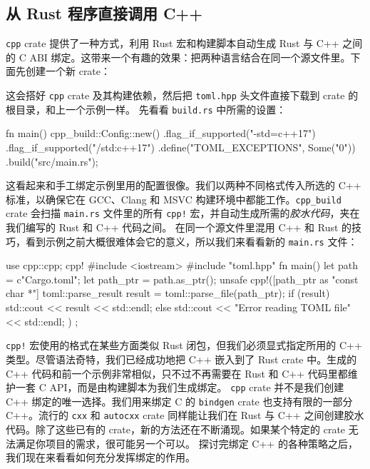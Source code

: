 \subsection{从 Rust 程序直接调用 C++}
\label{idx:idx_02f49e5b}
\texttt{cpp} crate 提供了一种方式，利用 Rust 宏和构建脚本自动生成 Rust 与 C++ 之间的 C ABI 绑定。这带来一个有趣的效果：把两种语言结合在同一个源文件里。下面先创建一个新 crate：
这会搭好 \texttt{cpp} crate 及其构建依赖，然后把 \texttt{toml.hpp} 头文件直接下载到 crate 的根目录，和上一个示例一样。
先看看 \texttt{build.rs} 中所需的设置：
\begin{codebox}[rust]
fn main() {
    cpp_build::Config::new()
        .flag_if_supported("-std=c++17")
        .flag_if_supported("/std:c++17")
        .define("TOML_EXCEPTIONS", Some("0"))
        .build("src/main.rs");
}
\end{codebox}
这看起来和手工绑定示例里用的配置很像。我们以两种不同格式传入所选的 C++ 标准，以确保它在 GCC、Clang 和 MSVC 构建环境中都能工作。\texttt{cpp\_build} crate 会扫描 \texttt{main.rs} 文件里的所有 \texttt{cpp!} 宏，并自动生成所需的\emph{胶水代码}，夹在我们编写的 Rust 和 C++ 代码之间。
\label{idx:idx_feae23f3}
在同一个源文件里混用 C++ 和 Rust 的技巧，看到示例之前大概很难体会它的意义，所以我们来看看新的 \texttt{main.rs} 文件：
\begin{codebox}[rust]
use cpp::cpp;
cpp! {{
    #include <iostream>
    #include "toml.hpp"
}}
fn main() {
    let path = c"Cargo.toml";
    let path_ptr = path.as_ptr();
    unsafe {
        cpp!([path_ptr as "const char *"] {
            toml::parse_result result =
                toml::parse_file(path_ptr);
            if (result) {
                std::cout << result << std::endl;
            } else {
                std::cout
                    << "Error reading TOML file"
                    << std::endl;
            }
        })
    };
}
\end{codebox}
\texttt{cpp!} 宏使用的格式在某些方面类似 Rust 闭包，但我们必须显式指定所用的 C++ 类型。尽管语法奇特，我们已经成功地把 C++ 嵌入到了 Rust crate 中。生成的 C++ 代码和前一个示例非常相似，只不过不再需要在 Rust 和 C++ 代码里都维护一套 C API，而是由构建脚本为我们生成绑定。
\label{idx:idx_00711b01}
\texttt{cpp} crate 并不是我们创建 C++ 绑定的唯一选择。我们用来绑定 C 的 \texttt{bindgen} crate 也支持有限的一部分 C++。流行的 \texttt{cxx} 和 \texttt{autocxx} crate 同样能让我们在 Rust 与 C++ 之间创建胶水代码。除了这些已有的 crate，新的方法还在不断涌现。如果某个特定的 crate 无法满足你项目的需求，很可能另一个可以。
探讨完绑定 C++ 的各种策略之后，我们现在来看看如何充分发挥绑定的作用。
